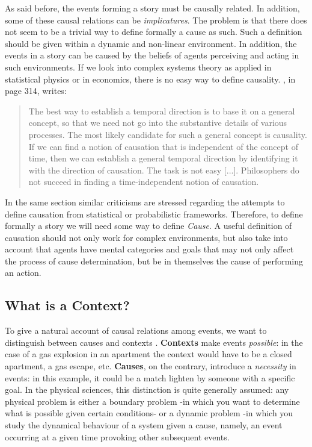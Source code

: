 \documentclass[
		twoside,openright,titlepage,numbers=noenddot,manychapters,
		headinclude,%
                footinclude=false,cleardoublepage=empty,
                BCOR=5mm,
		fontsize=11pt, %
                 enabledeprecatedfontcommands]{scrreprt}
\begin{document}
As said before, the events forming a story must be causally related. In addition, some of these causal relations can be \emph{implicatures}. The problem is that there does not seem to be a trivial way to define formally a cause as such. Such a definition should be given within a dynamic and non-linear environment. In addition, the events in a story can be caused by the beliefs of agents perceiving and acting in such environments. If we look into complex systems theory as applied in statistical physics or in economics, there is no easy way to  define causality. \cite{auyang1999foundations}, in page 314, writes:


\begin{quote}
The best way to establish a temporal direction is to base it on a general concept, so that we need not go into the substantive details of various processes. The most likely candidate for such a general concept is causality. If we can find a notion of causation that is independent of the concept of time, then we can establish a general temporal direction by identifying it with the direction of causation. The task is not easy [...]. Philosophers do not succeed in finding a time-independent notion of causation. \end{quote}

In the same section similar criticisms are stressed regarding the attempts to define causation from statistical or probabilistic frameworks. 
  Therefore, to define formally a story we will need some way to define \emph{Cause}. A useful definition of causation should not only work for complex environments, but also take into account that agents have mental categories and goals that may not only affect the process of cause determination, but be in themselves the cause of performing an action.



\subsection{What is a Context?}

To give a natural account of causal relations among events, we want to distinguish between causes and contexts \cite[]{cheng1991cve}. \textbf{Contexts} make events \emph{possible}: in the case of a gas explosion in an apartment the context would have to be a closed apartment, a gas escape, etc. \textbf{Causes}, on the contrary, introduce a \emph{necessity} in events: in this example, it could be a match lighten by someone with a specific goal.
In the physical sciences, this distinction is quite generally assumed: any physical problem is either a boundary problem -in which you want to determine what is possible given certain conditions- or a dynamic problem -in which you study the dynamical behaviour of a system given a cause, namely, an event occurring at a given time provoking other subsequent events.
\end{document}
